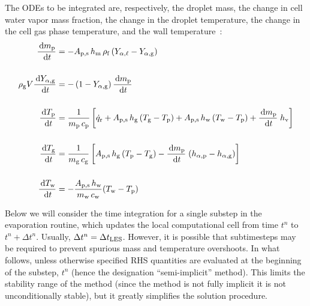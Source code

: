 The ODEs to be integrated are, respectively, the droplet mass, the change in cell water vapor mass fraction, the change in the droplet temperature, the change in the cell gas phase temperature, and the wall temperature~\cite{Cheremisinoff:1}:
\begin{align}
\frac{\,\mathrm{d} m_{\rm p}}{\,\mathrm{d} t} & = - A_{\rm p,s} \, h_{\rm m} \, \rho_{\rm f} \, (Y_{\alpha,\ell} - Y_{\rm \alpha, g}) \label{app_droplet_mass} \\[0.2in]
\rho_{\rm g} V \frac{\,\mathrm{d} Y_{\rm \alpha, g}}{\,\mathrm{d} t} & = -\left(1-Y_{\rm \alpha, g}\right)\frac{\,\mathrm{d} m_{\rm p}}{\,\mathrm{d} t}  \label{app_droplet_gas_fraction} \\[0.2in]
\frac{\,\mathrm{d} T_{\rm p}}{\,\mathrm{d} t} & = \frac{1}{m_{\rm p} \, c_{\rm p}}  \left[ \dot{q}_{\rm r} + A_{\rm p,s} \, h_{\rm g}  \, (T_{\rm g}-T_{\rm p}) + A_{\rm p,s} \, h_{\rm w}  \, (T_{\rm w}-T_{\rm p}) + \frac{\,\mathrm{d} m_{\rm p}}{\,\mathrm{d} t} \; h_{\rm v} \right]  \label{app_droplet_temp}  \\[0.2in]
\frac{\,\mathrm{d} T_{\rm g}}{\,\mathrm{d} t} & = \frac{1}{m_{\rm g} \, c_{\rm g}}  \left[A_{\rm p,s} \, h_{\rm g}  \, (T_{\rm p}-T_{\rm g}) - \frac{\,\mathrm{d} m_{\rm p}}{\,\mathrm{d} t} \; (h_{\rm \alpha,p}-h_{\rm \alpha,g}) \right]  \label{app_droplet_gas_temp}   \\[0.2in]
\frac{\,\mathrm{d} T_{\rm w}}{\,\mathrm{d} t} & = -\frac{A_{\rm p,s} \, h_{\rm w}}{m_{\rm w} \, c_{\rm w}} (T_{\rm w}-T_{\rm p})  \label{app_droplet_solid_temp}
\end{align}

	Below we will consider the time integration for a single substep in the evaporation routine, which updates the local computational cell from time $t^n$ to $t^n + \Delta t^n$.  Usually, $\Delta t^n = \Delta t_{\mathrm{\tiny LES}}$.  However, it is possible that subtimesteps may be required to prevent spurious mass and temperature overshoots.  In what follows, unless otherwise specified RHS quantities are evaluated at the beginning of the substep, $t^n$ (hence the designation ``semi-implicit'' method).  This limits the stability range of the method (since the method is not fully implicit it is not unconditionally stable), but it greatly simplifies the solution procedure.

